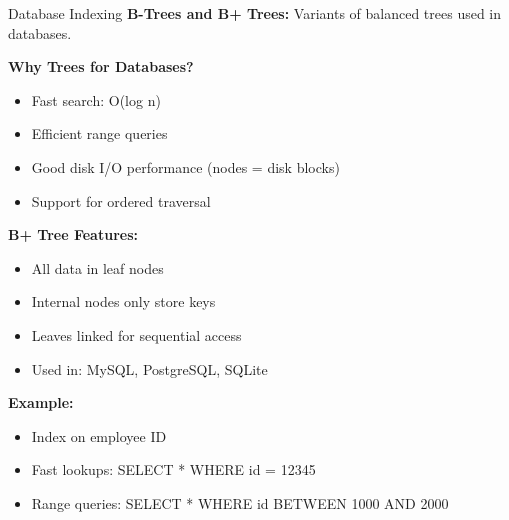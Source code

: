 \documentclass[aspectratio=169]{beamer}
\begin{document}
\begin{frame}{Database Indexing}
  \textbf{B-Trees and B+ Trees:} Variants of balanced trees used in databases.

  \vspace{0.3cm}
  \textbf{Why Trees for Databases?}
  \begin{itemize}
    \item Fast search: O(log n)
    \item Efficient range queries
    \item Good disk I/O performance (nodes = disk blocks)
    \item Support for ordered traversal
  \end{itemize}

  \vspace{0.3cm}
  \textbf{B+ Tree Features:}
  \begin{itemize}
    \item All data in leaf nodes
    \item Internal nodes only store keys
    \item Leaves linked for sequential access
    \item Used in: MySQL, PostgreSQL, SQLite
  \end{itemize}

  \vspace{0.3cm}
  \textbf{Example:}
  \begin{itemize}
    \item Index on employee ID
    \item Fast lookups: SELECT * WHERE id = 12345
    \item Range queries: SELECT * WHERE id BETWEEN 1000 AND 2000
  \end{itemize}
\end{frame}
\end{document}
